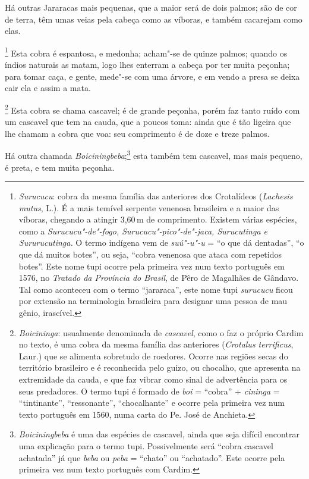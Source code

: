 \begin{linenumbers}
 Há outras Jararacas mais pequenas, que a maior será de dois palmos; são
de cor de terra, têm umas veias pela cabeça como as víboras, e também
cacarejam como elas.

\footnote{ \textit{Surucucu}: cobra da mesma
família das anteriores dos Crotalídeos (\textit{Lachesis mutus}, L.).
É a mais temível serpente venenosa brasileira e a maior das víboras,
chegando a atingir 3,60\,m de comprimento. Existem várias espécies, como
a \textit{Surucucu"-de"-fogo, Surucucu"-pico"-de"-jaca, Surucutinga e
Sururucutinga.} O termo indígena vem de \textit{suú"-u"-u} = ``o que dá
dentadas'', ``o que dá muitos botes'', ou seja, ``cobra venenosa que ataca
com repetidos botes''. Este nome tupi ocorre pela primeira vez num texto
português em 1576, no \textit{Tratado da Província do Brasil}, de Pêro de
Magalhães de Gândavo. Tal como aconteceu com o termo ``jararaca'', este
nome tupi \textit{surucucu} ficou por extensão na terminologia
brasileira para designar uma pessoa de mau gênio, irascível.} 
Esta cobra é espantosa, e medonha; acham"-se de quinze
palmos; quando os índios naturais as matam, logo lhes enterram a cabeça
por ter muita peçonha; para tomar caça, e gente, mede"-se com uma
árvore, e em vendo a presa se deixa cair ela e assim a mata. 

\footnote{ \textit{Boicininga}: usualmente
denominada de \textit{cascavel}, como o faz o próprio Cardim no texto,
é uma cobra da mesma família das anteriores (\textit{Crotalus
terrificus}, Laur.) que se alimenta sobretudo de roedores. Ocorre nas
regiões secas do território brasileiro e é reconhecida pelo guizo, ou
chocalho, que apresenta na extremidade da cauda, e que faz vibrar como
sinal de advertência para os seus predadores. O termo tupi é formado
de \textit{boi} = ``cobra'' + \textit{cininga} = ``tintinante'',
``ressonante'', ``chocalhante'' e ocorre pela primeira vez num texto
português em 1560, numa carta do Pe. José de
Anchieta.} Esta cobra se chama cascavel; é de grande peçonha,
porém faz tanto ruído com um cascavel que tem na cauda, que a poucos
toma: ainda que é tão ligeira que lhe chamam a cobra que voa: seu
comprimento é de doze e treze palmos.

 Há outra chamada \textit{Boiciningbeba};\footnote{ \textit{Boiciningbeba} 
é uma das espécies de cascavel, ainda que seja
difícil encontrar uma explicação para o termo tupi. Possivelmente será
``cobra cascavel achatada'' já que \textit{beba} ou \textit{peba} =
``chato'' ou ``achatado''. Este ocorre pela primeira vez num texto
português com Cardim.} esta também tem cascavel, mas mais pequeno, é
preta, e tem muita peçonha.


\end{linenumbers}
